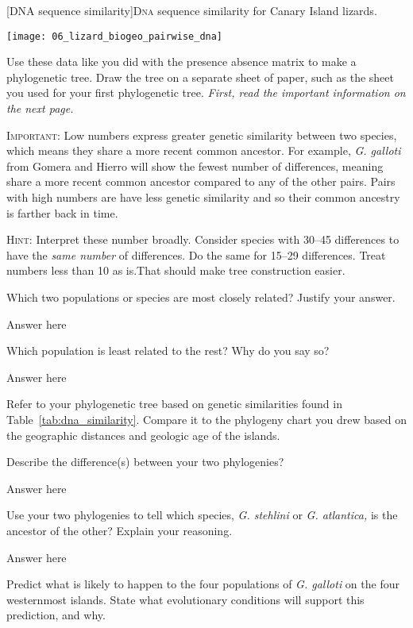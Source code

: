 \documentclass[12pt, hidelinks]{exam}
\newcommand*\AnswerBox[2]{%
    \parbox[t][#1]{0.92\textwidth}{%
    \begin{solution}#2\end{solution}}
    \vspace{\stretch{1}}
}
\begin{document}
\begin{questions}
\vspace{\baselineskip}

{[DNA sequence similarity]{D\textsc{na} sequence similarity for Canary Island lizards.\label{tab:dna_similarity}}

	\texttt{[image: 06\_lizard\_biogeo\_pairwise\_dna]}
}

\question
Use these data like you did with the presence absence matrix to make a phylogenetic tree. Draw the tree on a separate sheet of paper, such as the sheet you used for your first phylogenetic tree. \emph{First, read the important information on the next page.}

\textsc{Important:} Low numbers express greater genetic similarity between two species, which means they share a more recent common ancestor. For example, \textit{G. galloti} from Gomera and Hierro will show the fewest number of differences, meaning share a more recent common ancestor compared to any of the other pairs. Pairs with high numbers are have less genetic similarity and so their common ancestry is farther back in time.

\textsc{Hint:} Interpret these number broadly. Consider species with 30–45 differences to have the \emph{same number} of differences. Do the same for 15–29 differences. Treat numbers less than 10 as is.That should make tree construction easier. 

\question
Which two populations or species are most closely related? Justify your answer. 

\AnswerBox{2\baselineskip}{Answer here}

\question
Which population is least related to the rest? Why do you say so? 

\AnswerBox{2\baselineskip}{Answer here}

Refer to your phylogenetic tree based on genetic similarities found in Table~\ref{tab:dna_similarity}. Compare it to the phylogeny chart you drew based on the geographic distances and geologic age of the islands. 

\question Describe the difference(s) between your two phylogenies? 

\AnswerBox{2\baselineskip}{Answer here}

\question
Use your two phylogenies to tell which species, \textit{G. stehlini} or \textit{G. atlantica,} is the ancestor of the other? Explain your reasoning. 

\AnswerBox{2\baselineskip}{Answer here}

\question
Predict what is likely to happen to the four populations of \textit{G. galloti} on the four westernmost islands. State what evolutionary conditions will support this prediction, and why.


\end{questions}
\end{document}
